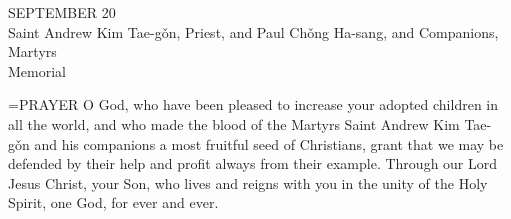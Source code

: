 \begin{center}\normalsize SEPTEMBER 20\\
\footnotesize Saint Andrew Kim Tae-gǒn, Priest, and Paul Chǒng Ha-sang, and Companions, \\
\footnotesize Martyrs\\
\footnotesize Memorial\\
\end{center}

\hangindent=\parindent \small{PRAYER 
O God, who have been pleased to increase
your adopted children in all the world,
and who made the blood of the Martyrs
Saint Andrew Kim Tae-gǒn and his companions
a most fruitful seed of Christians,
grant that we may be defended by their help
and profit always from their example.
Through our Lord Jesus Christ, your Son,
who lives and reigns with you in the unity of the Holy Spirit,
one God, for ever and ever.\\}
 

